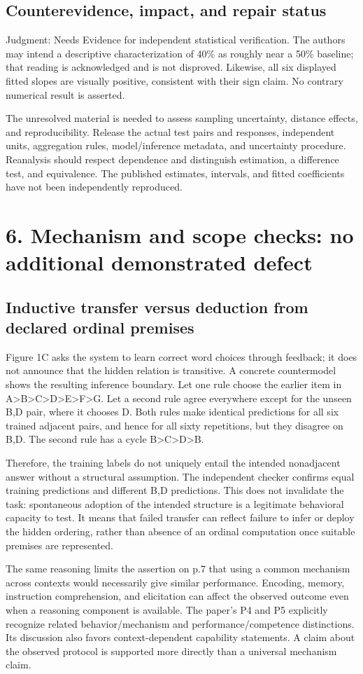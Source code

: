 \documentclass[10pt]{article}
\begin{document}
\subsection*{Counterevidence, impact, and repair status}
Judgment: Needs Evidence for independent statistical verification. The authors may intend a descriptive characterization of 40\% as roughly near a 50\% baseline; that reading is acknowledged and is not disproved. Likewise, all six displayed fitted slopes are visually positive, consistent with their sign claim. No contrary numerical result is asserted.\par
The unresolved material is needed to assess sampling uncertainty, distance effects, and reproducibility. Release the actual test pairs and responses, independent units, aggregation rules, model/inference metadata, and uncertainty procedure. Reanalysis should respect dependence and distinguish estimation, a difference test, and equivalence. The published estimates, intervals, and fitted coefficients have not been independently reproduced.\par
\section*{6. Mechanism and scope checks: no additional demonstrated defect}
\subsection*{Inductive transfer versus deduction from declared ordinal premises}
Figure 1C asks the system to learn correct word choices through feedback; it does not announce that the hidden relation is transitive. A concrete countermodel shows the resulting inference boundary. Let one rule choose the earlier item in A>B>C>D>E>F>G. Let a second rule agree everywhere except for the unseen B,D pair, where it chooses D. Both rules make identical predictions for all six trained adjacent pairs, and hence for all sixty repetitions, but they disagree on B,D. The second rule has a cycle B>C>D>B.\par
Therefore, the training labels do not uniquely entail the intended nonadjacent answer without a structural assumption. The independent checker confirms equal training predictions and different B,D predictions. This does not invalidate the task: spontaneous adoption of the intended structure is a legitimate behavioral capacity to test. It means that failed transfer can reflect failure to infer or deploy the hidden ordering, rather than absence of an ordinal computation once suitable premises are represented.\par
The same reasoning limits the assertion on p.7 that using a common mechanism across contexts would necessarily give similar performance. Encoding, memory, instruction comprehension, and elicitation can affect the observed outcome even when a reasoning component is available. The paper’s P4 and P5 explicitly recognize related behavior/mechanism and performance/competence distinctions. Its discussion also favors context-dependent capability statements. A claim about the observed protocol is supported more directly than a universal mechanism claim.\par
\end{document}
